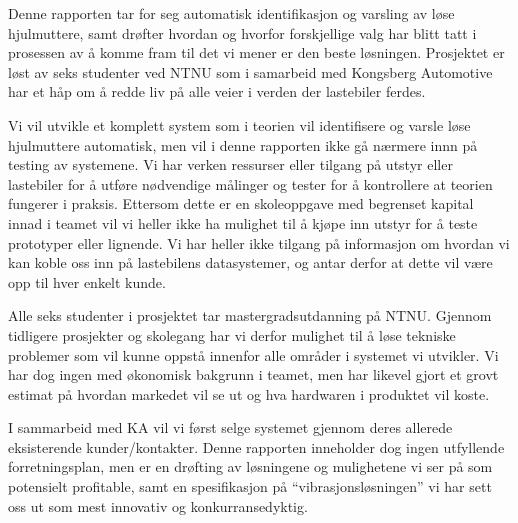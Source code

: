 
Denne rapporten tar for seg automatisk identifikasjon og varsling av løse hjulmuttere, samt drøfter hvordan og hvorfor forskjellige
valg har blitt tatt i prosessen av å komme fram til det vi mener er den beste løsningen. Prosjektet er løst av seks studenter ved NTNU
som i samarbeid med Kongsberg Automotive har et håp om å redde liv på alle veier i verden der lastebiler ferdes. 

Vi vil utvikle et komplett system som i teorien vil identifisere og varsle løse hjulmuttere automatisk, men vil i denne rapporten ikke 
gå nærmere innn på testing av systemene. Vi har verken ressurser eller tilgang på utstyr eller lastebiler for å utføre 
nødvendige målinger og tester for å kontrollere at teorien fungerer i praksis. Ettersom dette er en skoleoppgave med begrenset
kapital innad i teamet vil vi heller ikke ha mulighet til å kjøpe inn utstyr for å teste prototyper eller lignende. Vi har heller ikke 
tilgang på informasjon om hvordan vi kan koble oss inn på lastebilens datasystemer, og antar derfor at dette vil være opp til hver
enkelt kunde.

Alle seks studenter i prosjektet tar mastergradsutdanning på NTNU. Gjennom tidligere prosjekter og skolegang har vi derfor
mulighet til å løse tekniske problemer som vil kunne oppstå innenfor alle områder i systemet vi utvikler. Vi har dog ingen med
økonomisk bakgrunn i teamet, men har likevel gjort et grovt estimat på hvordan markedet vil se ut og hva hardwaren i produktet
vil koste.

I sammarbeid med KA vil vi først selge systemet gjennom deres allerede eksisterende kunder/kontakter. Denne rapporten
inneholder dog ingen utfyllende forretningsplan, men er en drøfting av løsningene og mulighetene vi ser på
som potensielt profitable, samt en spesifikasjon på ``vibrasjonsløsningen'' vi har sett oss ut som mest innovativ og konkurransedyktig.